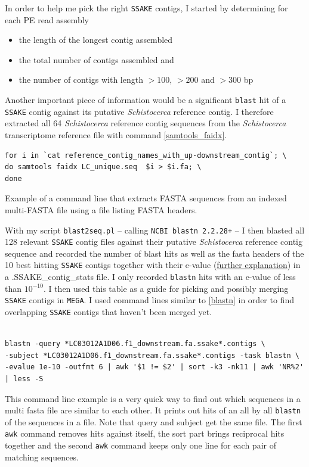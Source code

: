 \documentclass[a4paper,12pt,times,print,index,custombib,custommargin]{PhDThesisPSnPDF}\usepackage[]{graphicx}\usepackage[]{color}
\begin{document}
In order to help me pick the right \texttt{SSAKE} contigs, I started by determining for each PE read assembly
%
\begin{itemize}
\item the length of the longest contig assembled 
\item the total number of contigs assembled and
\item the number of contigs with length $>100$, $>200$ and $>300$ \gls{bp}
\end{itemize}
%
Another important piece of information would be a significant \texttt{blast} hit of a \texttt{SSAKE} contig against its putative \textit{Schistocerca} reference contig. I therefore extracted all 64 \textit{Schistocerca} reference contig sequences from the \textit{Schistocerca} transcriptome reference file with command \ref{samtools_faidx}.
%
\begin{cmd}
\captionsetup{type=cmd}
\begin{Verbatim}[fontsize=\scriptsize, formatcom=\color{darkgray}]
for i in `cat reference_contig_names_with_up-downstream_contig`; \
do samtools faidx LC_unique.seq  $i > $i.fa; \
done
\end{Verbatim}
\caption{\small Example of a command line that extracts FASTA sequences from an indexed multi-FASTA file using a file listing FASTA headers.}
\label{samtools_faidx}
\end{cmd}
%
With my script \texttt{blast2seq.pl} -- calling \texttt{NCBI blastn 2.2.28+} \citep{Camacho2009} -- I then blasted all 128 relevant \texttt{SSAKE} contig files against their putative \textit{Schistocerca} reference contig sequence and recorded the number of blast hits as well as the fasta headers of the 10 best hitting \texttt{SSAKE} contigs together with their \gls{e-value} (\href{http://blast.ncbi.nlm.nih.gov/Blast.cgi?CMD=Web&PAGE_TYPE=BlastDocs&DOC_TYPE=FAQ#expect}{further explanation}) in a \textsf{.SSAKE\_contig\_stats} file. I only recorded \texttt{blastn} hits with an \gls{e-value} of less than $10^{-10}$. I then used this table as a guide for picking and possibly merging \texttt{SSAKE} contigs in \texttt{MEGA}. I used command lines similar to \ref{blastn} in order to find overlapping \texttt{SSAKE} contigs that haven't been merged yet.
%
\begin{cmd}
\captionsetup{type=cmd}
\begin{Verbatim}[fontsize=\scriptsize, formatcom=\color{darkgray}]

blastn -query *LC03012A1D06.f1_downstream.fa.ssake*.contigs \
-subject *LC03012A1D06.f1_downstream.fa.ssake*.contigs -task blastn \
-evalue 1e-10 -outfmt 6 | awk '$1 != $2' | sort -k3 -nk11 | awk 'NR%2' | less -S
\end{Verbatim}
\caption{\small This command line example is a very quick way to find out which sequences in a multi fasta file are similar to each other. It prints out hits of an all by all \texttt{blastn} of the sequences in a file. Note that query and subject get the same file. The first \texttt{awk} command removes hits against itself, the sort part brings reciprocal hits together and the second \texttt{awk} command keeps only one line for each pair of matching sequences.}
\label{blastn}
\end{cmd}
\end{document}
